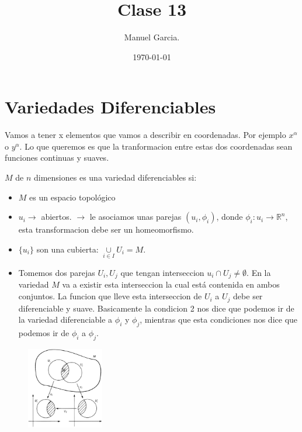 \documentclass{article}
\title{Clase 13 }
\author{Manuel Garcia.}
\date{\today}
\begin{document}
\maketitle

\section{Variedades Diferenciables}

Vamos a tener x elementos que vamos a describir en coordenadas. Por ejemplo $ x ^ {\alpha } $ o $ y ^ {\alpha} $. Lo que queremos es que la tranformacion entre estas dos coordenadas sean funciones continuas y suaves.

$ M  $ de $ n  $ dimensiones es una variedad diferenciables si: 
\begin{itemize}
  \item $ M  $ es un espacio topológico 
  \item $ u_i  \rightarrow $ abiertos. $ \rightarrow  $ le asociamos unas parejas $ (u_i,\phi_i) $, donde $ \phi_i: u_i \rightarrow \mathbb{R}^ {n } $, esta transformacion debe ser un homeomorfismo.
  \item $ \{u_i\} $ son una cubierta: $ \underset{i \in I }{\cup }U_i = M  $.
  \item Tomemos dos parejas $ U_i, U_j  $ que tengan interseccion $ u_i \cap U_j \neq \emptyset   $. En la variedad $ M  $ va a existir esta interseccion la cual está contenida en ambos conjuntos. La funcion que lleve esta interseccion de $ U_i  $ a $ U_j  $ debe ser diferenciable y suave. Basicamente la condicion 2 nos dice que podemos ir de la variedad diferenciable a $ \phi_i  $ y $ \phi_j  $, mientras que esta condiciones nos dice que podemos ir de $ \phi_i  $ a $ \phi_j  $. 
\end{itemize}

\begin{figure}[H]
  \begin{center}
    \includegraphics[width=0.3\textwidth]{transformaciones.png}
  \end{center}
\end{figure}
\end{document}
